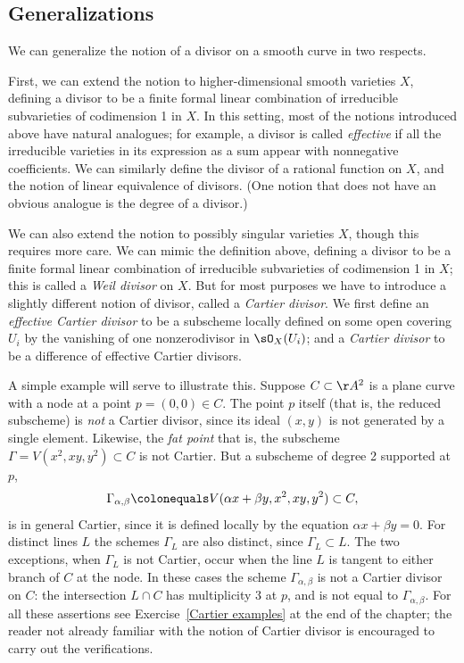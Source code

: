 \subsection*{Generalizations}

We can generalize the notion of a divisor on a smooth curve in two respects.

First, we can extend the notion to higher-dimensional smooth varieties
$X$, defining a divisor to be a finite formal linear combination of
irreducible subvarieties of codimension 1 in $X$. In this setting,
most of the notions introduced above have natural analogues; for
%
example, a divisor is called \emph{effective} if all the irreducible
varieties in its expression as a sum appear with nonnegative
coefficients. We can similarly define the divisor of a rational
function on $X$, and the notion of linear equivalence of divisors.
(One notion that does not have an obvious analogue is the degree of a divisor.)

We can also extend the notion to possibly singular varieties $X$,
though this requires more care. We can mimic the definition above,
defining a divisor to be a finite formal linear combination of
irreducible subvarieties of codimension 1 in $X$; this is called a
%
\emph{Weil divisor} on $X$. But for most purposes we have to introduce
a slightly different notion of divisor, called a \emph{Cartier
  divisor}. We first define an \emph{effective Cartier divisor} to be
%
a subscheme locally defined on some open covering $U_{i}$ by the
vanishing of one nonzerodivisor in $\sO_{X}(U_{i})$; and a
\emph{Cartier divisor} to be a difference of effective Cartier divisors.

A simple example will serve to illustrate this. Suppose $C \subset
\AA^2$ is a plane curve with a node at a point $p = (0,0) \in C$. The
point $p$ itself (that is, the reduced subscheme) is \emph{not} a
Cartier divisor, since its ideal $(x,y)$ is not generated by a single
element. Likewise, the
%
\emph{fat point}
\emdash that is, the subscheme $\Gamma = V(x^2, xy, y^2) \subset C$
\emdash is not Cartier. But a subscheme of degree 2 supported at $p$,
$$
\Gamma_{\alpha, \beta} \colonequals V(\alpha x + \beta y, x^2, xy, y^2) \subset C,
$$
\emdash
is in general Cartier,
since
it is defined locally by the equation $\alpha x + \beta y = 0$.
For distinct lines $L$ the schemes $\Gamma_{L}$ are also distinct,
since $\Gamma_{L}\subset L$. The two exceptions, when $\Gamma_{L}$ is
not Cartier, occur when the line $L$ is tangent to either branch of
$C$ at the node.
In these cases the scheme $\Gamma_{\alpha, \beta}$ is not a Cartier
divisor on $C$: the intersection $L \cap C$ has multiplicity 3 at $p$,
and is not equal to $\Gamma_{\alpha, \beta}$.
For all these assertions see
Exercise~\ref{Cartier examples}
at the end of the chapter;
the reader
not already familiar with the notion of Cartier divisor is
encouraged to carry out the verifications.

